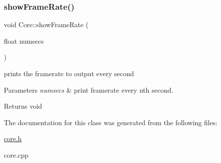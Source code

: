 \subsubsection{\texorpdfstring{show\+Frame\+Rate()}{showFrameRate()}}
{\footnotesize\ttfamily void Core\+::show\+Frame\+Rate (\begin{DoxyParamCaption}\item[{float}]{numsecs }\end{DoxyParamCaption})}



prints the framerate to output every second 


\begin{DoxyParams}{Parameters}
{\em numsecs} & print framerate every nth second. \\
\hline
\end{DoxyParams}
\begin{DoxyReturn}{Returns}
void 
\end{DoxyReturn}


The documentation for this class was generated from the following files\+:\begin{DoxyCompactItemize}
\item 
\hyperlink{core_8h}{core.\+h}\item 
core.\+cpp\end{DoxyCompactItemize}
